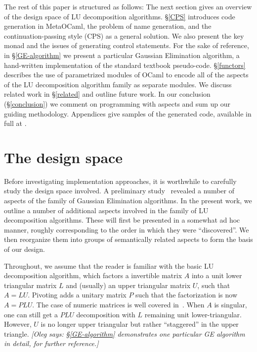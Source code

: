 \documentclass{elsart}
\newcommand{\oleg}[1]{{\it [Oleg says: #1]}}
\begin{document}
The rest of this paper is structured as follows: The next section
gives an overview of the design space of LU decomposition algorithms.
\S\ref{CPS}
introduces code generation in MetaOCaml, the problem of name
generation, and the continuation-passing style (CPS) as a general
solution.  We also present the key monad and the issues of generating
control statements. For the sake of reference, in \S\ref{GE-algorithm} 
we present a particular Gaussian Elimination algorithm,
a hand-written implementation of the standard textbook pseudo-code.
\S\ref{functors} describes the use of
parametrized modules of OCaml to encode all of the aspects of the
LU decomposition algorithm family as separate
modules.  We discuss related work in
\S\ref{related} and outline future work. In our
conclusion (\S\ref{conclusion}) we comment
on programming with aspects and sum up our guiding methodology.
Appendices give samples of the generated code, available in
full at \cite{metamonadsURL}.

\section{The design space}\label{design}

Before investigating implementation approaches, it is worthwhile to
carefully study the design space involved.  A preliminary
study~\cite{Carette06} revealed a number of aspects of the family of
Gaussian Elimination algorithms.  In the present work, we outline a
number of additional aspects involved in the family of LU
decomposition algorithms.  These will first be presented in a somewhat
ad hoc manner, roughly corresponding to the order in which they were
``discovered''.  We then reorganize them into groups of
semantically related aspects to form the basis of our design.

Throughout, we assume that the reader is familiar with the basic LU
decomposition algorithm, which factors a invertible matrix $A$ into a unit
lower triangular matrix $L$ and (usually) an upper triangular matrix $U$,
such that $A = LU$.  Pivoting adds a unitary matrix $P$ such
that the factorization is now $A = PLU$.  The case of numeric matrices is well
covered in~\cite{Golub-vanLoan}.  When $A$ is singular, one can still get
a $PLU$ decomposition with $L$ remaining unit lower-triangular. However, 
$U$ is no longer upper triangular but rather ``staggered''
in the upper triangle.
\oleg{\S\ref{GE-algorithm} demonstrates one particular GE algorithm in detail,
  for further reference.}
\end{document}
